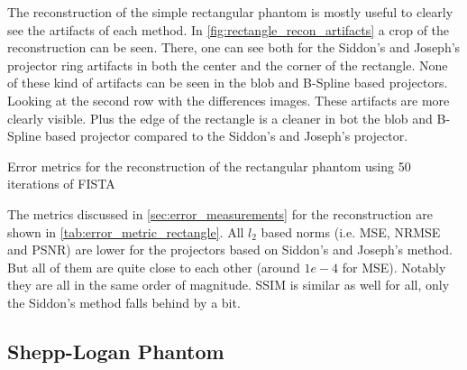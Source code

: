 The reconstruction of the simple rectangular phantom is mostly useful to clearly see the artifacts
of each method. In \autoref{fig:rectangle_recon_artifacts} a crop of the reconstruction can be seen.
There, one can see both for the Siddon's and Joseph's projector ring artifacts in both the center
and the corner of the rectangle. None of these kind of artifacts can be seen in the blob and
B-Spline based projectors. Looking at the second row with the differences images. These artifacts
are more clearly visible. Plus the edge of the rectangle is a cleaner in bot the blob and B-Spline
based projector compared to the Siddon's and Joseph's projector.

\begin{table}[h]%
	\centering
	\caption{Error metrics for the reconstruction of the rectangular phantom using 50 iterations
		of FISTA}%
	\label{tab:error_metric_rectangle}
\end{table}

The metrics discussed in \autoref{sec:error_measurements} for the reconstruction are shown in
\autoref{tab:error_metric_rectangle}. All \(l_2\) based norms (i.e. \gls{MSE}, \gls{NRMSE} and
\gls{PSNR}) are lower for the projectors based on Siddon's and Joseph's method. But all of them are
quite close to each other (around \(1e-4\) for \gls{MSE}). Notably they are all in the same order of
magnitude. \gls{SSIM} is similar as well for all, only the Siddon's method falls behind by a bit.

\subsection{Shepp-Logan Phantom}

